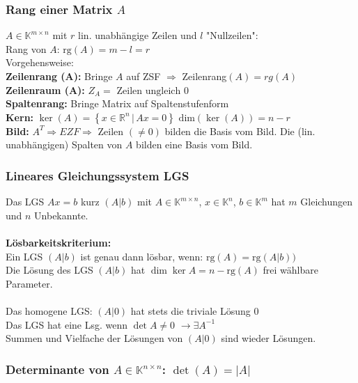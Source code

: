\documentclass[6pt,a4paper]{scrartcl}
\newcommand{\dme}[2]{\ensuremath{\left\{#1\,\vert\,#2 \right\}}}
\newcommand{\Ra}[0]{\ensuremath{\Rightarrow}}
\begin{document}
\begin{multicols}{4}
\subsubsection{Rang einer Matrix $A$}
$A\in \mathbb K^{m\times n}$ mit $r$ lin. unabhängige Zeilen und $l$ "Nullzeilen":\\
Rang von $A$: $\mathrm{rg}(A)=m-l=r$\\  
Vorgehensweise: \\
\textbf{Zeilenrang (A):} Bringe $A$ auf ZSF $\Ra$ Zeilenrang$(A) = rg(A)$\\     
\textbf{Zeilenraum (A):}  $Z_A = \text{ Zeilen ungleich } 0$            \\
\textbf{Spaltenrang:} Bringe Matrix auf Spaltenstufenform        \\
\textbf{Kern:  }   $\ker(A) = \dme{x \in \mathbb R^n}{Ax= 0}$ \qquad $\mathrm{dim}(\ker(A))=n-r$ \\
\textbf{Bild: } $A^T \Ra EZF \Ra $ Zeilen $(\not= 0)$ bilden die Basis vom Bild. Die (lin. unabhängigen) Spalten von $A$ bilden eine Basis vom Bild.
\subsubsection{Lineares Gleichungssystem LGS}
Das LGS $Ax=b$ kurz $(A|b)$ mit $A\in \mathbb K^{m\times n}$, $x\in \mathbb K^n$, $b\in \mathbb K^m$ hat $m$ Gleichungen und $n$ Unbekannte.\\
\\
\textbf{Lösbarkeitskriterium:}\\
Ein LGS $(A|b)$ ist genau dann lösbar, wenn: $\mathrm{rg}(A)=\mathrm{rg}(A|b))$\\
Die Lösung des LGS $(A|b)$ hat $\dim{\ker A} = n-\mathrm{rg}(A)$ frei wählbare Parameter.\\
\\
Das homogene LGS: $(A|0)$ hat stets die triviale Lösung $0$\\
Das LGS hat eine Lsg. wenn $\det A \not= 0$ \quad $\rightarrow \exists A^{-1}$ \\
Summen und Vielfache der Lösungen von $(A|0)$ sind wieder Lösungen.

\subsubsection{Determinante von $A\in \mathbb K^{n\times n}$: $\det(A)=|A|$}


\end{multicols}
\end{document}
